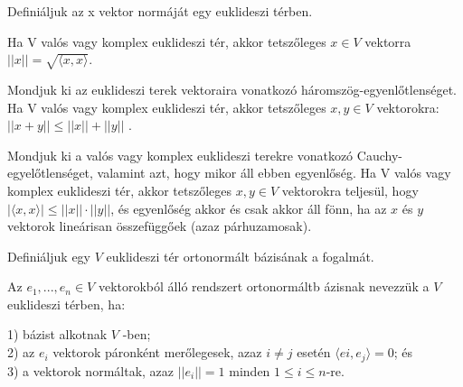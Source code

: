 \begin{frame}
  \begin{tcolorbox}[title={40}]
   Definiáljuk az x vektor normáját egy euklideszi térben.

  \tcblower
Ha V valós vagy komplex euklideszi tér, akkor tetszőleges $x \in V$ vektorra $||x|| = \sqrt{{\langle}x, x{\rangle}}$.

  \end{tcolorbox}
\end{frame}


\begin{frame}
  \begin{tcolorbox}[title={41}]
     Mondjuk ki az euklideszi terek vektoraira vonatkozó háromszög-egyenlőtlenséget.
  \tcblower
Ha V valós vagy komplex euklideszi tér, akkor tetszőleges $x,y \in V$ vektorokra: $||x + y|| \leq ||x|| + ||y||$ .

  \end{tcolorbox}
\end{frame}


\begin{frame}
  \begin{tcolorbox}[title={42}]
    Mondjuk ki a valós vagy komplex euklideszi terekre vonatkozó Cauchy-egyelőtlenséget, valamint azt, hogy mikor áll ebben egyenlőség.
  \tcblower
Ha V valós vagy komplex euklideszi tér, akkor tetszőleges $x,y \in V$ vektorokra teljesül, hogy $|{\langle}x, x{\rangle}| \leq ||x|| \cdot ||y||$, és egyenlőség akkor és csak akkor áll fönn, ha az $x$ és $y$ vektorok lineárisan összefüggőek (azaz párhuzamosak).

  \end{tcolorbox}
\end{frame}


\begin{frame}
  \begin{tcolorbox}[title={43}]
    Definiáljuk egy $V$ euklideszi tér ortonormált bázisának a fogalmát.

  \tcblower
Az $e_1,...,e_n \in V$ vektorokból álló rendszert ortonormáltb ázisnak nevezzük a $V$ euklideszi térben, ha:\\
\mmedskip

1) bázist alkotnak $V$ -ben;\\
2) az $e_i$ vektorok páronként merőlegesek, azaz $i \neq j$ esetén ${\langle}ei,e_j{\rangle} = 0$; és\\
3) a vektorok normáltak, azaz $||e_i|| = 1$ minden $1 \leq i \leq n$-re. 
  \end{tcolorbox}
\end{frame}


